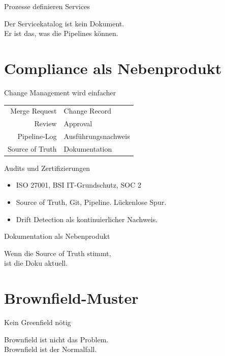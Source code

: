 \documentclass[aspectratio=1610,14pt]{beamer}
\newcommand{\hero}[1]{%
  \vfill
  \begin{center}
    {\sffamily #1\par}
  \end{center}
  \vfill
}
\begin{document}
  \begin{frame}{Prozesse definieren Services}
    \hero{Der Servicekatalog ist kein Dokument.\\
    Er ist das, was die Pipelines können.}
  \end{frame}

  \section{Compliance als Nebenprodukt}
  \begin{frame}{Change Management wird einfacher}
    \vfill
    \begin{center}
      \renewcommand{\arraystretch}{1.5}
      \begin{tabular}{r @{\;\textcolor{copper}{$=$}\;} l}
        Merge Request    & Change Record \\
        Review           & Approval \\
        Pipeline-Log     & Ausführungsnachweis \\
        Source of Truth  & Dokumentation \\
      \end{tabular}
    \end{center}
    \vfill
  \end{frame}

  \begin{frame}{Audits und Zertifizierungen}
    \begin{itemize}
      \item ISO 27001, BSI IT-Grundschutz, SOC 2
      \item Source of Truth, Git, Pipeline. Lückenlose Spur.
      \item Drift Detection als kontinuierlicher Nachweis.
    \end{itemize}
  \end{frame}

  \begin{frame}{Dokumentation als Nebenprodukt}
    \hero{Wenn die Source of Truth stimmt,\\
    ist die Doku aktuell.}
  \end{frame}

  \section{Brownfield-Muster}
  \begin{frame}{Kein Greenfield nötig}
    \hero{Brownfield ist nicht das Problem.\\
    Brownfield ist der Normalfall.}
  \end{frame}
\end{document}
